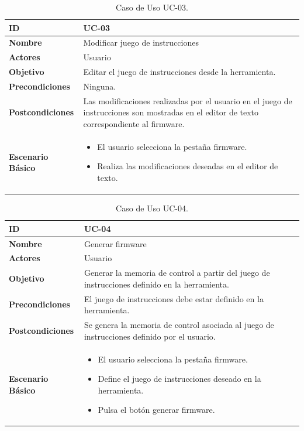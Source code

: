 \begin{center}
\begin{table}[htbp]
\centering
\begin{tabular}{@{}p{2.5cm} p{9cm}@{}} 
\toprule
\textbf{ID}	& UC-03  \\
\midrule
\textbf{Nombre} 		& Modificar juego de instrucciones   \\
\midrule
\textbf{Actores} 		&	Usuario  \\
\midrule
\textbf{Objetivo} 	&	Editar el juego de instrucciones desde la herramienta. 	 \\
\midrule
\textbf{Precondiciones}	&	Ninguna.   \\
\midrule
\textbf{Postcondiciones} 	& Las modificaciones realizadas por el usuario en el juego de instrucciones son mostradas en el editor de texto correspondiente al firmware.   \\
\midrule
\textbf{Escenario Básico} 	&  \begin{itemize}
\item El usuario selecciona la pestaña firmware.
\item Realiza las modificaciones deseadas en el editor de texto.
\end{itemize} \\
\bottomrule
\end{tabular}
\caption{Caso de Uso UC-03.}
\label{tab:uc03}
\end{table}
\end{center}

\begin{center}
\begin{table}[htbp]
\centering
\begin{tabular}{@{}p{2.5cm} p{9cm}@{}} 
\toprule
\textbf{ID}	& UC-04  \\
\midrule
\textbf{Nombre} 		& Generar firmware   \\
\midrule
\textbf{Actores} 		&	Usuario  \\
\midrule
\textbf{Objetivo} 	&	Generar la memoria de control a partir del juego de instrucciones definido en la herramienta. 	 \\
\midrule
\textbf{Precondiciones}	&	El juego de instrucciones debe estar definido en la herramienta.   \\
\midrule
\textbf{Postcondiciones} 	& Se genera la memoria de control asociada al juego de instrucciones definido por el usuario.   \\
\midrule
\textbf{Escenario Básico} 	&  \begin{itemize}
\item El usuario selecciona la pestaña firmware.
\item Define el juego de instrucciones deseado en la herramienta.
\item Pulsa el botón generar firmware.
\end{itemize} \\
\bottomrule
\end{tabular}
\caption{Caso de Uso UC-04.}
\label{tab:uc04}
\end{table}
\end{center}

